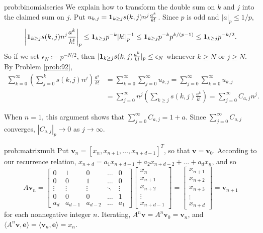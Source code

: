 \begin{sol}{prob:binomialseries} We explain how to transform the double sum on $k$ and $j$ into the claimed sum on $j$. Put $u_{k,j} = \mathbf{1}_{k\ge j} s(k,j) n^j \frac{a^k}{k!}$. Since $p$ is odd and $|a|_p\le 1/p$, 
\[ \left|\mathbf{1}_{k\ge j} s(k,j) n^j \frac{a^k}{k!}\right|_p \le \mathbf{1}_{k\ge j} p^{-k} |k!|_p^{-1} \le \mathbf{1}_{k\ge j} p^{-k} p^{k/(p-1)} \le \mathbf{1}_{k\ge j} p^{-k/2}.\]  So if we set $\epsilon_N := p^{-N/2}$, then $|\mathbf{1}_{k\ge j} s(k,j)\frac{a^k}{k!}|_p \le \epsilon_N$ whenever $k\ge N$ or $j\ge N$. By Problem \ref{prob:92}, 
\begin{align*} \sum_{k=0}^{\infty} \left(\sum_{j=0}^{k} s(k,j) n^j\right) \frac{a^k}{k!} &= \sum_{k=0}^{\infty} \sum_{j=0}^{\infty} u_{k,j} = \sum_{j=0}^{\infty} \sum_{k=0}^{\infty} u_{k,j} \\ &= \sum_{j=0}^{\infty} n^j \left(\sum_{k\ge j} s(k,j)\frac{a^k}{k!}\right) = \sum_{j=0}^{\infty} C_{a,j} n^j. \end{align*}

When $n=1$, this argument shows that $\sum_{j=0}^{\infty} C_{a,j} = 1+a$. Since $\sum_{j=0}^{\infty} C_{a,j}$ converges,  $|C_{a,j}|_p \to 0$ as $j\to\infty$. 
\end{sol}


\begin{sol}{prob:matrixmult} Put $\textbf{v}_n = [x_n, x_{n+1}, \dots, x_{n+d-1}]^{T}$, so that $\textbf{v} = \textbf{v}_0$. According to our recurrence relation, $x_{n+d} = a_1 x_{n+d-1} + a_2 x_{n+d-2} + \dots + a_d x_{n}$, and so
\[ A \textbf{v}_n =  \left[\begin{matrix} 
0 & 1 & 0  & \hdots & 0\\
0 & 0 & 1  & \hdots & 0 \\
\vdots & \vdots & \vdots & \ddots & \vdots \\
0 & 0 & 0 & \hdots & 1 \\
a_d & a_{d-1} & a_{d-2} & \hdots & a_1
\end{matrix}\right]\left[
\begin{matrix}
x_n \\
x_{n+1} \\
x_{n+2} \\
\vdots \\
x_{n+d-1}
\end{matrix}
\right] = 
\left[
\begin{matrix}
x_{n+1} \\
x_{n+2} \\
x_{n+3} \\
\vdots \\
x_{n+d}
\end{matrix}
\right] = \textbf{v}_{n+1}
\]
for each nonnegative integer $n$. Iterating, $A^n\textbf{v} = A^n\textbf{v}_0 = \textbf{v}_n$, and $\langle A^n \textbf{v},\textbf{e} \rangle = \langle \textbf{v}_n,\textbf{e}\rangle = x_n$.
\end{sol}

